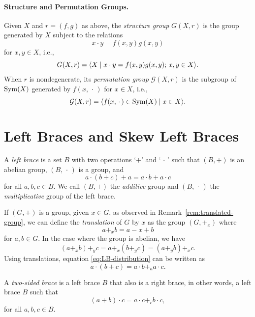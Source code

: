 \paragraph{Structure and Permutation Groups.} Given\/ $X$ and\/ $r=(f,g)$ as above, the \textsl{structure group}\/ $G(X,r)$ is the group generated by\/ $X$ subject to the relations
$$
    x\cdot y=f(x,y)g(x,y)
$$
for\/ $x,y\in X$, i.e.,
$$
    G(X,r)=\langle X\mid x\cdot y=f(x,y)g(x,y);\,x,y\in X\rangle.
$$
When\/ $r$ is nondegenerate, its \textsl{permutation group}\/ $\mathcal G(X,r)$ is the subgroup of\/ ${\rm Sym}(X)$ generated by\/ $f(x,\,\cdot\,)$ for\/ $x\in X$, i.e.,
$$
    \mathcal G(X,r)=\langle f(x,\,\cdot\,)\in{\rm Sym}(X)\mid x\in X\rangle.
$$

\section{Left Braces and Skew Left Braces}

\begin{defn}
    A \textsl{left brace} is a set\/ $B$ with two operations\/ `$+$' and\/ `$\,\cdot\,$' such that\/ $(B, +)$ is an abelian group,\/ $(B,\,\cdot\,)$ is a group, and
    \begin{equation}\label{eq:LB-distribution}
        a\cdot (b + c) + a = a\cdot b + a\cdot c
    \end{equation}
    for all\/ $a, b, c \in B$. We call\/ $(B, +)$ the \textsl{additive} group and\/ $(B, \,\cdot\,)$ the \textsl{multiplicative} group of the left brace.
\end{defn}

\begin{rem}
    If\/ $(G,+)$ is a group, given\/ $x\in G$, as observed in Remark~\ref{rem:translated-group}, we can define the \textsl{translation} of\/ $G$ by\/ $x$ as the group\/ $(G,+_x)$ where
    $$
        a +_x b = a - x + b
    $$
    for\/ $a,b\in G$. In the case where the group is abelian, we have
    $$
        (a +_x b) +_y c = a +_x (b +_y c) = (a +_y b) +_x c.
    $$
    Using translations, equation \eqref{eq:LB-distribution} can be written as
    $$
        a\cdot (b+c)= a\cdot b +_a a\cdot c.
    $$
\end{rem}

\begin{defn}
    A \textsl{two-sided brace} is a left brace\/ $B$ that also is a right brace, in other words, a left brace\/ $B$ such that
    $$
        (a + b)\cdot c = a\cdot c +_c b\cdot c,
    $$
    for all\/ $a, b, c \in B$.
\end{defn}

